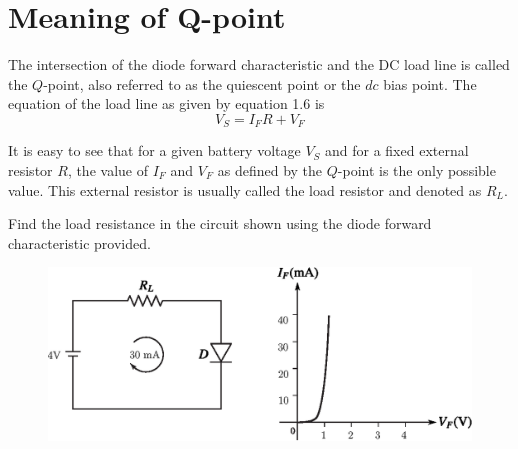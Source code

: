 \section{Meaning of Q-point}\label{sec1.18}

The intersection of the diode forward characteristic and the DC load
line is called the $Q$-point, also referred to as the quiescent point
or the $dc$ bias point. The equation of the load line as given by
equation 1.6 is
$$
V_S = I_F R + V_F
$$

It is easy to see that for a given battery voltage $V_S$ and for a
fixed external resistor $R$, the value of $I_F$ and $V_F$ as defined
by the $Q$-point is the only possible value. This external resistor
is usually called the load resistor and denoted as $R_L$.

\begin{example}\label{exam1.17}
Find the load resistance in the circuit shown using the diode forward
characteristic provided.
\begin{figure}[H]
\centering
\includegraphics[scale=.8]{chap1/exp1.17.eps}
\end{figure}
\end{example}

